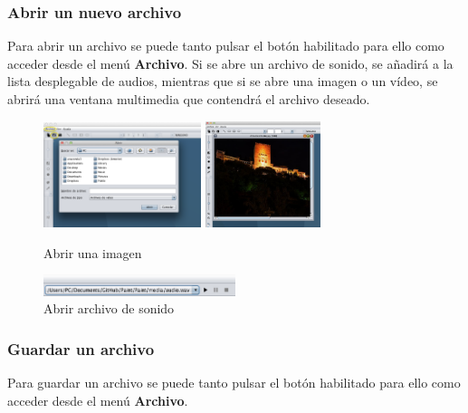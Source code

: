 \subsubsection{Abrir un nuevo archivo}
Para abrir un archivo se puede tanto pulsar el botón habilitado para ello como acceder desde el menú \textbf{Archivo}. Si se abre un archivo de sonido, se añadirá a la lista desplegable de audios, mientras que si se abre una imagen o un vídeo, se abrirá una ventana multimedia que contendrá el archivo deseado.
\vskip0.3cm
\begin{figure}[H]
 \centering
  \includegraphics[width=0.41\textwidth]{generales/abrirImagen1.png}
  \includegraphics[width=0.3\textwidth]{generales/abrirImagen2.png}
 \caption{Abrir una imagen}
 \label{diseño}
 \end{figure}
 \vskip0.3cm
\begin{figure}[H]
 \centering
  \includegraphics[width=0.5\textwidth]{sonido/archivoAbierto.png}
 \caption{Abrir archivo de sonido}
 \label{diseño}
 \end{figure}
\subsubsection{Guardar un archivo}
Para guardar un archivo se puede tanto pulsar el botón habilitado para ello como acceder desde el menú \textbf{Archivo}.
